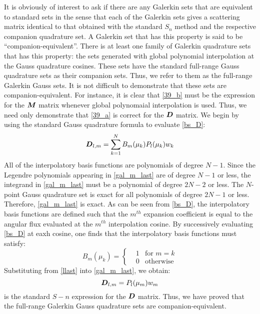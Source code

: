 It is obviously of interest to ask if there are any Galerkin sets that are
equivalent to standard sets in the sense that each of the Galerkin sets gives
a scattering matrix identical to that obtained with the standard $S_n$ method
and the respective companion quadrature set. A Galerkin set that has this
property is said to be ``companion-equivalent''. There is at least one family
of Galerkin quadrature sets that has this property: the sets generated with
global polynomial interpolation at the Gauss quadrature cosines. These sets
have the standard full-range Gauss quadrature sets as their companion sets.
Thus, we refer to them as the full-range Galerkin Gauss sets. It is not
difficult to demonstrate that these sets are companion-equivalent. For
instance, it is clear that \cref{39_b} must be the expression for the $\boldsymbol{M}$
matrix whenever global polynomaial interpolation is used. Thus, we need only
demonstrate that \cref{39_a} is correct for the $\boldsymbol{D}$ matrix. We begin by
using the standard Gauss quadrature formula to evaluate \cref{bs_D}:
\begin{equation}
\bs{D}_{l,m} = \sum_{k=1}^N B_m(\mu_k) P_l(\mu_k) w_k
\label{gal_m_last}
\end{equation}
All of the interpolatory basis functions are polynomials of degree $N-1$.
Since the Legendre polynomials appearing in \cref{gal_m_last} are of degree
$N-1$ or less, the integrand in \cref{gal_m_last} must be a polynomial of
degree $2N-2$ or less. The $N$-point Gauss quadrature set is exact for all
polynomials of degree $2N-1$ or less. Therefore, \cref{gal_m_last} is exact.
As can be seen from \cref{bs_D}, the interpolatory basis functions are defined
such that the $m^{th}$ expansion coefficient is equal to the angular flux
evaluated at the $m^{th}$ interpolation cosine. By successively evaluating
\cref{bs_D} at eaxh cosine, one finds that the interpolatory basis functions
must satisfy:
\begin{equation}
B_m(\mu_k) = \left\{
\begin{aligned}
&1 & \textrm{for }m=k\\
&0 &\textrm{otherwise}
\end{aligned}
\right.
\label{llast}
\end{equation}
Substituting from \cref{llast} into \cref{gal_m_last}, we obtain:
\begin{equation}
\bs{D}_{l,m} = P_l(\mu_m)w_m
\label{lllast}
\end{equation}
 is the standard $S-n$ expression for the $\boldsymbol{D}$ matrix. Thus,
we have proved that the full-range Galerkin Gauss quadrature sets are
companion-equivalent.

